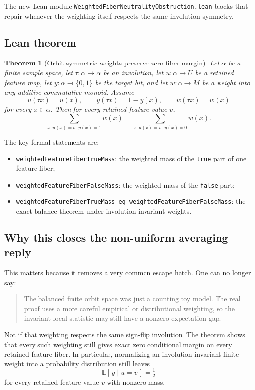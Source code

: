 \documentclass[11pt]{article}
\newtheorem{theorem}{Theorem}[section]
\theoremstyle{remark}
\begin{document}
The new Lean module \texttt{WeightedFiberNeutralityObstruction.lean} blocks that repair whenever
the weighting itself respects the same involution symmetry.

\subsection{Lean theorem}

\begin{theorem}[Orbit-symmetric weights preserve zero fiber margin]
Let \(\alpha\) be a finite sample space, let \(\tau : \alpha \to \alpha\) be an involution, let
\(u : \alpha \to U\) be a retained feature map, let \(y : \alpha \to \{0,1\}\) be the target bit,
and let \(w : \alpha \to M\) be a weight into any additive commutative monoid.  Assume
\[
  u(\tau x) = u(x), \qquad y(\tau x) = 1-y(x), \qquad w(\tau x) = w(x)
\]
for every \(x \in \alpha\).  Then for every retained feature value \(v\),
\[
  \sum_{x : u(x)=v,\ y(x)=1} w(x)
  =
  \sum_{x : u(x)=v,\ y(x)=0} w(x).
\]
\end{theorem}

\noindent
The key formal statements are:
\begin{itemize}[leftmargin=1.5em]
  \item \texttt{weightedFeatureFiberTrueMass}: the weighted mass of the \texttt{true} part of one
  feature fiber;
  \item \texttt{weightedFeatureFiberFalseMass}: the weighted mass of the \texttt{false} part;
  \item \texttt{weightedFeatureFiberTrueMass\_eq\_weightedFeatureFiberFalseMass}: the exact balance
  theorem under involution-invariant weights.
\end{itemize}

\subsection{Why this closes the non-uniform averaging reply}

This matters because it removes a very common escape hatch.  One can no longer say:
\begin{quote}
The balanced finite orbit space was just a counting toy model.  The real proof uses a more
careful empirical or distributional weighting, so the invariant local statistic may still have a
nonzero expectation gap.
\end{quote}

Not if that weighting respects the same sign-flip involution.  The theorem shows that every such
weighting still gives exact zero conditional margin on every retained feature fiber.  In
particular, normalizing an involution-invariant finite weight into a probability distribution
still leaves
\[
  \mathbb{E}[\,y \mid u=v\,] = \tfrac12
\]
for every retained feature value \(v\) with nonzero mass.
\end{document}
